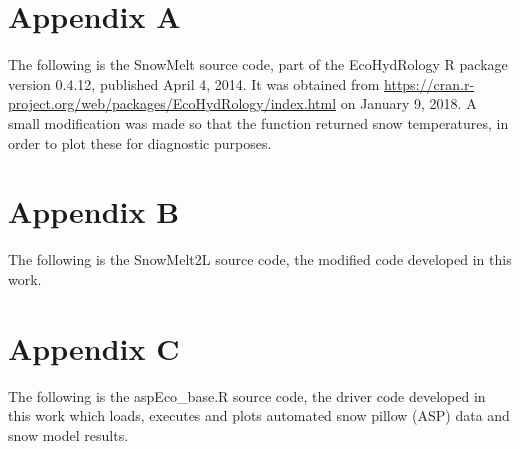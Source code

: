 \documentclass[12pt]{article}
\begin{document}
\begin{landscape}
\pagestyle{empty}


\section{Appendix A}
The following is the SnowMelt source code, part of the EcoHydRology R package version 0.4.12, published April 4, 2014.
It was obtained from \url{https://cran.r-project.org/web/packages/EcoHydRology/index.html} on January 9, 2018.
A small modification was made so that the function returned snow temperatures, in order to plot these for diagnostic purposes.

\bigskip



\newpage
\section{Appendix B}
The following is the SnowMelt2L source code, the modified code developed in this work.

\bigskip



\newpage
\section{Appendix C}
The following is the aspEco\_base.R source code, the driver code developed in this work which loads, executes and plots automated snow pillow (ASP) data and snow model results.

\bigskip




\end{landscape}
\end{document}
